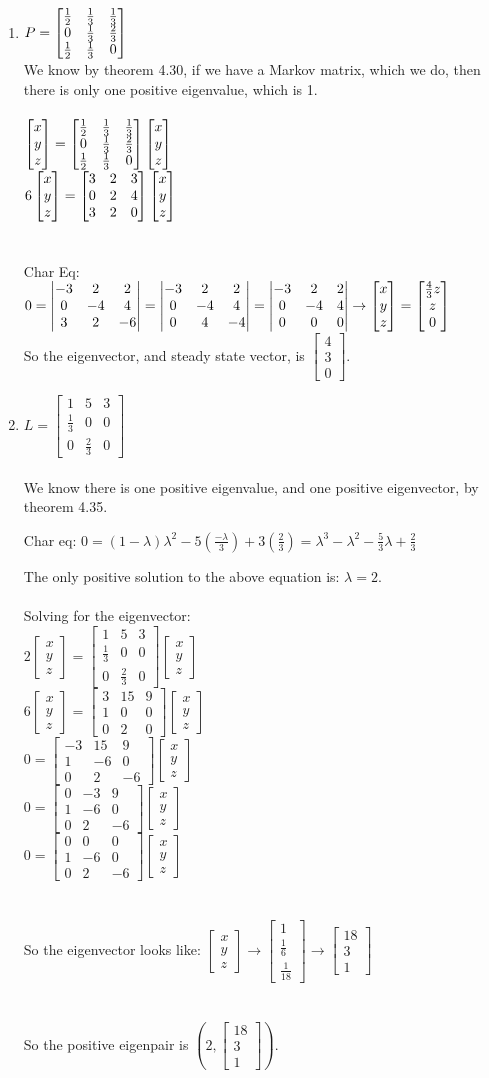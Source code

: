 \documentclass{article}
\newcommand{\newVect}[3]{\begin{bmatrix}#1 \\ #2 \\ #3\end{bmatrix}}
\newcommand{\newttt}[9]{\begin{bmatrix}#1 & #2 & #3\\ #4 & #5 & #6 \\ #7 & #8 & #9\end{bmatrix}}
\begin{document}
\begin{enumerate}
\item
$P = \matP$\\
We know by theorem 4.30, if we have a Markov matrix, which we do, then there is only one positive eigenvalue, which is 1.\\\\
$\newVect{x}{y}{z} = \matP \newVect{x}{y}{z}$\\
$6\newVect{x}{y}{z} = \matPmult \newVect{x}{y}{z}$\\\\\\
Char Eq: \\
$0 = \newtttdet{-3}{2}{2}{0}{-4}{4}{3}{2}{-6} = \newtttdet{-3}{2}{2}{0}{-4}{4}{0}{4}{-4} = \newtttdet{-3}{2}{2}{0}{-4}{4}{0}{0}{0} \rightarrow \newVect{x}{y}{z} = \newVect{\frac{4}{3} z}{z}{0}$\\
So the eigenvector, and steady state vector, is $\newVect{4}{3}{0}$.

\item
$L = \newttt{1}{5}{3}{\frac{1}{3}}{0}{0}{0}{\frac{2}{3}}{0}$\\\\
We know there is one positive eigenvalue, and one positive eigenvector, by theorem 4.35.\par
Char eq: $0 = (1-\lambda)\lambda^2 - 5(\frac{-\lambda}{3}) + 3(\frac{2}{3}) = \lambda^3 - \lambda^2 - \frac{5}{3}\lambda + \frac{2}{3}$\par
The only positive solution to the above equation is: $\lambda = 2$.\\\\
Solving for the eigenvector:\\
$2\newVect{x}{y}{z} = \newttt{1}{5}{3}{\frac{1}{3}}{0}{0}{0}{\frac{2}{3}}{0} \newVect{x}{y}{z}$\\
$6\newVect{x}{y}{z} = \newttt{3}{15}{9}{1}{0}{0}{0}{2}{0}\newVect{x}{y}{z}$\\
$0 = \newttt{-3}{15}{9}{1}{-6}{0}{0}{2}{-6} \newVect{x}{y}{z}$\\
$0 = \newttt{0}{-3}{9}{1}{-6}{0}{0}{2}{-6} \newVect{x}{y}{z}$\\
$0 = \newttt{0}{0}{0}{1}{-6}{0}{0}{2}{-6} \newVect{x}{y}{z}$\\\\\\
So the eigenvector looks like: $\newVect{x}{y}{z} \rightarrow \newVect{1}{\frac{1}{6}}{\frac{1}{18}} \rightarrow \newVect{18}{3}{1}$\\\\\\
So the positive eigenpair is $(2, \newVect{18}{3}{1})$.



\end{enumerate}
\end{document}
